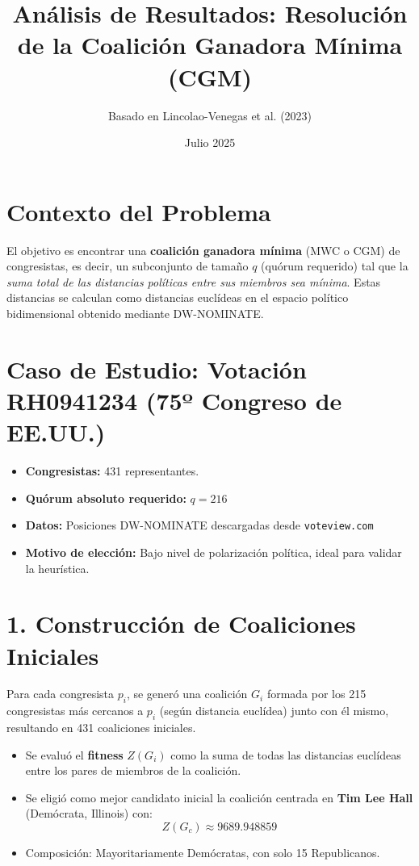 \documentclass[12pt]{article}
\title{Análisis de Resultados: Resolución de la Coalición Ganadora Mínima (CGM)}
\author{Basado en Lincolao-Venegas et al. (2023)}
\date{Julio 2025}
\begin{document}
\maketitle

\section*{Contexto del Problema}

El objetivo es encontrar una \textbf{coalición ganadora mínima} (MWC o CGM) de congresistas, es decir, un subconjunto de tamaño $q$ (quórum requerido) tal que la \emph{suma total de las distancias políticas entre sus miembros sea mínima}. Estas distancias se calculan como distancias euclídeas en el espacio político bidimensional obtenido mediante DW-NOMINATE.

\section*{Caso de Estudio: Votación RH0941234 (75º Congreso de EE.UU.)}

\begin{itemize}
    \item \textbf{Congresistas:} 431 representantes.
    \item \textbf{Quórum absoluto requerido:} $q = 216$
    \item \textbf{Datos:} Posiciones DW-NOMINATE descargadas desde \texttt{voteview.com}
    \item \textbf{Motivo de elección:} Bajo nivel de polarización política, ideal para validar la heurística.
\end{itemize}

\section*{1. Construcción de Coaliciones Iniciales}

Para cada congresista $p_i$, se generó una coalición $G_i$ formada por los 215 congresistas más cercanos a $p_i$ (según distancia euclídea) junto con él mismo, resultando en 431 coaliciones iniciales.

\begin{itemize}
    \item Se evaluó el \textbf{fitness} $Z(G_i)$ como la suma de todas las distancias euclídeas entre los pares de miembros de la coalición.
    \item Se eligió como mejor candidato inicial la coalición centrada en \textbf{Tim Lee Hall} (Demócrata, Illinois) con:
    \[
    Z(G_c) \approx 9689.948859
    \]
    \item Composición: Mayoritariamente Demócratas, con solo 15 Republicanos.
\end{itemize}
\end{document}

